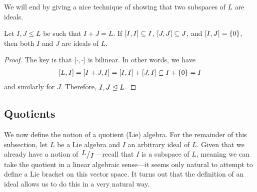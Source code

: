 We will end by giving a nice technique of showing that two subspaces of $L$ are ideals.

\begin{boxproposition}
    Let $I, J \leq L$ be such that $I + J = L$. If $\left[ I, I \right] \subseteq I$, $\left[ J, J \right] \subseteq J$, and $\left[ I, J \right] = \left\{ 0 \right\}$, then both $I$ and $J$ are ideals of $L$.
\end{boxproposition}
\begin{proof}
    The key is that $\left[ \cdot, \cdot \right]$ is bilinear. In other words, we have
    \begin{align*}
        \left[ L, I \right] = \left[ I + J, I \right] = \left[ I, I \right] + \left[ J, I \right] \subseteq I + \left\{ 0 \right\} = I
    \end{align*}
    and similarly for $J$. Therefore, $I, J \trianglelefteq L$.
\end{proof}

\subsection{Quotients}

We now define the notion of a quotient (Lie) algebra. For the remainder of this subsection, let $L$ be a Lie algebra and $I$ an arbitrary ideal of $L$. Given that we already have a notion of $\quotient{L}{I}$---recall that $I$ is a subspace of $L$, meaning we can take the quotient in a linear algebraic sense---it seems only natural to attempt to define a Lie bracket on this vector space. It turns out that the definition of an ideal allows us to do this in a very natural way.

